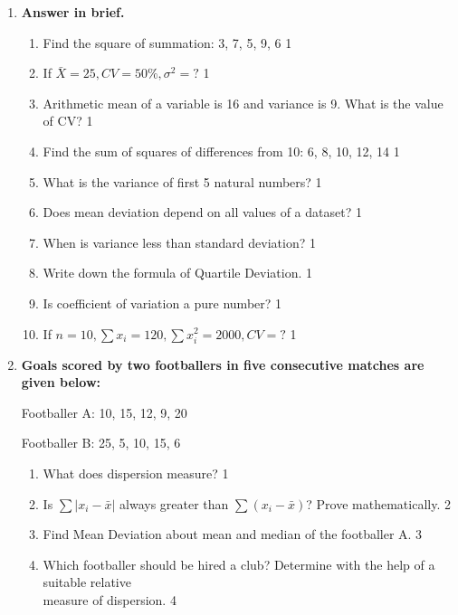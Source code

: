 \documentclass{exam}
\begin{document}
\begin{enumerate}

\item \textbf{Answer in brief.}

\begin{enumerate}

   \item Find the square of summation: 3, 7, 5, 9, 6 \hfill 1  
   \item If $\bar X = 25, CV = 50\%, \sigma^2=?$ \hfill 1
   \item Arithmetic mean of a variable is 16 and variance is 9. What is the value of CV? \hfill 1
   \item Find the sum of squares of differences from 10: 6, 8, 10, 12, 14 \hfill 1  
   \item What is the variance of first 5 natural numbers? \hfill 1
    \item Does mean deviation depend on all values of a dataset? \hfill 1
    \item When is variance less than standard deviation? \hfill 1
    \item Write down the formula of Quartile Deviation. \hfill 1
    \item Is coefficient of variation a pure number? \hfill 1
    \item If $n=10, \sum x_i = 120, \sum x_i^2=2000, CV=?$ \hfill 1


\end{enumerate}

    \item
  \textbf{Goals scored by two footballers in five consecutive matches are given below:}

    \begin{center}

    Footballer A: 10, 15, 12, 9, 20

    Footballer B: 25, 5, 10, 15, 6
    
    \end{center}
  \begin{enumerate}
  \item What does dispersion measure?  \hfill 1
   \item Is $\sum |x_i-\bar x|$ always greater than $\sum (x_i-\bar x)$? Prove mathematically. \hfill 2
    \item  
	Find Mean Deviation about mean and median of the footballer A.  \hfill 3
    \item
	Which footballer should be hired a club? Determine with the help of a suitable relative \\ measure of dispersion. \hfill 4
\end{enumerate}

\end{enumerate}
\end{document}
